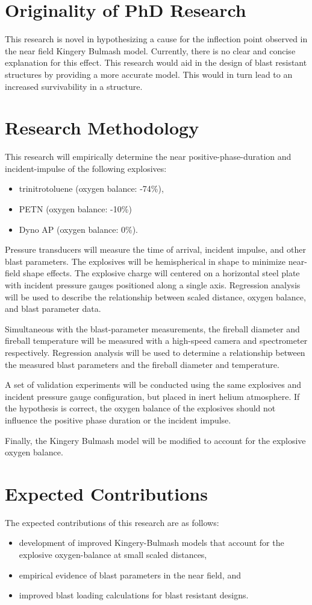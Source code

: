 \section{Originality of PhD Research}
This research is novel in hypothesizing a cause for the inflection point observed in the near field Kingery Bulmash model. Currently, there is no clear and concise explanation for this effect. This research would aid in the design of blast resistant structures by providing a more accurate model. This would in turn lead to an increased survivability in a structure.
\section{Research Methodology}
This research will empirically determine the near positive-phase-duration and incident-impulse of the following explosives:
\begin{itemize}
    \item trinitrotoluene (oxygen balance: -74\%),
    \item PETN (oxygen balance: -10\%)
    \item Dyno AP (oxygen balance: 0\%).
\end{itemize}
Pressure transducers will measure the time of arrival, incident impulse, and other blast parameters.  The explosives will be hemispherical in shape to minimize near-field shape effects.  The explosive charge will centered on a horizontal steel plate with incident pressure gauges positioned along a single axis.  Regression analysis will be used to describe the relationship between scaled distance, oxygen balance, and blast parameter data.

Simultaneous with the blast-parameter measurements, the fireball diameter and fireball temperature will be measured with a high-speed camera and spectrometer respectively.  Regression analysis will be used to determine a relationship between the measured blast parameters and the fireball diameter and temperature.

A set of validation experiments will be conducted using the same explosives and incident pressure gauge configuration, but placed in inert helium atmosphere.  If the hypothesis is correct, the oxygen balance of the explosives should not influence the positive phase duration or the incident impulse.

Finally, the Kingery Bulmash model will be modified to account for the explosive oxygen balance.
\section{Expected Contributions}
The expected contributions of this research are as follows:
\begin{itemize}
    \item development of improved Kingery-Bulmash models that account for the explosive oxygen-balance at small scaled distances,
    \item empirical evidence of blast parameters in the near field, and
    \item improved blast loading calculations for blast resistant designs.
\end{itemize}

